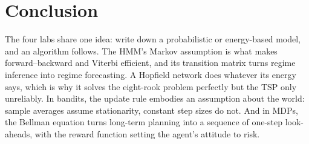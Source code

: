 \documentclass[journal]{IEEEtran}
\begin{document}
\section{Conclusion}
The four labs share one idea: write down a probabilistic or energy-based model, and an algorithm
follows. The HMM's Markov assumption is what makes forward--backward and Viterbi efficient, and its
transition matrix turns regime inference into regime forecasting. A Hopfield network does whatever
its energy says, which is why it solves the eight-rook problem perfectly but the TSP only
unreliably. In bandits, the update rule embodies an assumption about the world: sample averages
assume stationarity, constant step sizes do not. And in MDPs, the Bellman equation turns
long-term planning into a sequence of one-step look-aheads, with the reward function setting the
agent's attitude to risk.



\end{document}
